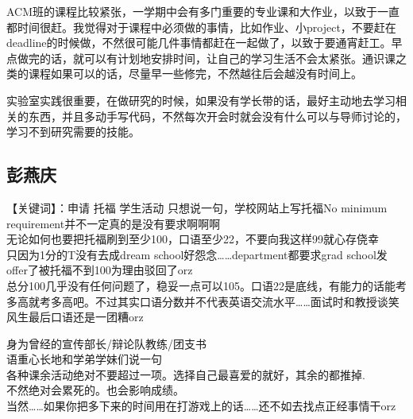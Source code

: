 \documentclass{vivid_layout}
\begin{document}
ACM班的课程比较紧张，一学期中会有多门重要的专业课和大作业，以致于一直都时间很赶。我觉得对于课程中必须做的事情，比如作业、小project，不要赶在deadline的时候做，不然很可能几件事情都赶在一起做了，以致于要通宵赶工。早点做完的话，就可以有计划地安排时间，让自己的学习生活不会太紧张。通识课之类的课程如果可以的话，尽量早一些修完，不然越往后会越没有时间上。

实验室实践很重要，在做研究的时候，如果没有学长带的话，最好主动地去学习相关的东西，并且多动手写代码，不然每次开会时就会没有什么可以与导师讨论的，学习不到研究需要的技能。

\subsection{{ 彭燕庆}}

【关键词】：申请 托福 学生活动
只想说一句，学校网站上写托福No minimum requirement并不一定真的是没有要求啊啊啊\\
无论如何也要把托福刷到至少100，口语至少22，不要向我这样99就心存侥幸\\
只因为1分的T没有去成dream school好怨念……department都要求grad school发offer了被托福不到100为理由驳回了orz\\
总分100几乎没有任何问题了，稳妥一点可以105。口语22是底线，有能力的话能考多高就考多高吧。不过其实口语分数并不代表英语交流水平……面试时和教授谈笑风生最后口语还是一团糟orz

身为曾经的宣传部长/辩论队教练/团支书\\
语重心长地和学弟学妹们说一句\\
各种课余活动绝对不要超过一项。选择自己最喜爱的就好，其余的都推掉.\\
不然绝对会累死的。也会影响成绩。\\
当然……如果你把多下来的时间用在打游戏上的话……还不如去找点正经事情干orz

\end{document}
